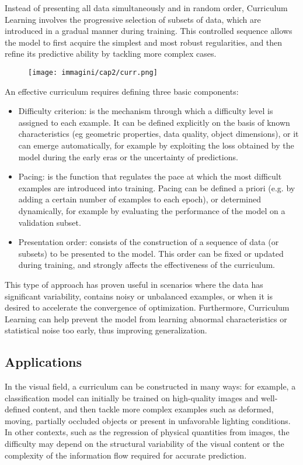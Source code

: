 Instead of presenting all data simultaneously and in random order, Curriculum Learning involves the progressive selection of subsets of data, which are introduced in a gradual manner during training. This controlled sequence allows the model to first acquire the simplest and most robust regularities, and then refine its predictive ability by tackling more complex cases.
\begin{figure}[!ht]
    \centering
    \texttt{[image: immagini/cap2/curr.png]}
    \caption{}
    \label{fig:curriculum}
\end{figure}

An effective curriculum requires defining three basic components:
\begin{itemize}
    \item{Difficulty criterion}: is the mechanism through which a difficulty level is assigned to each example. It can be defined explicitly on the basis of known characteristics (eg geometric properties, data quality, object dimensions), or it can emerge automatically, for example by exploiting the loss obtained by the model during the early eras or the uncertainty of predictions.
    \item{Pacing}:  is the function that regulates the pace at which the most difficult examples are introduced into training. Pacing can be defined a priori (e.g. by adding a certain number of examples to each epoch), or determined dynamically, for example by evaluating the performance of the model on a validation subset.
    \item{Presentation order}: consists of the construction of a sequence of data (or subsets) to be presented to the model. This order can be fixed or updated during training, and strongly affects the effectiveness of the curriculum.
\end{itemize}


This type of approach has proven useful in scenarios where the data has significant variability, contains noisy or unbalanced examples, or when it is desired to accelerate the convergence of optimization. Furthermore, Curriculum Learning can help prevent the model from learning abnormal characteristics or statistical noise too early, thus improving generalization.

\subsection*{Applications}
In the visual field, a curriculum can be constructed in many ways: for example, a classification model can initially be trained on high-quality images and well-defined content, and then tackle more complex examples such as deformed, moving, partially occluded objects or present in unfavorable lighting conditions.
In other contexts, such as the regression of physical quantities from images, the difficulty may depend on the structural variability of the visual content or the complexity of the information flow required for accurate prediction.

